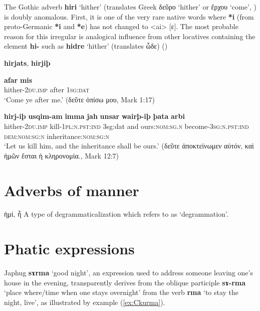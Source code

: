 \documentclass[11pt]{article}
\newcommand{\ipa}[1]{{\phon\textbf{#1}}}
\newcommand{\ipap}[1]{{\phon#1}}
\newcommand{\refb}[1]{(\ref{#1})}
\newcommand{\grec}[1]{{\mleccha #1}}
\begin{document}
The Gothic adverb \ipa{hiri} `hither' (translates Greek \grec{δεῦρο} `hither' or \grec{ἔρχου} `come', \citealt[185; H67]{lehmann86gothic}) is doubly anomalous. First, it is one of the very rare native words where \ipa{*i} (from proto-Germanic \ipa{*i} and \ipa{*e}) has not changed to <ai> [\ipap{ɛ}]. The most probable reason for this irregular is analogical influence from other locatives containing the element \ipa{hi-} such as \ipa{hidre} `hither' (translates \grec{ὧδε}) (\citealt{cercignani84hiri})

 \ipa{hirjats}, \ipa{hirjiþ}
 \citet[104]{braune53gotische}

\begin{exe}
\ex 
\gll \ipa{hirj-ats} \ipa{afar} \ipa{mis} \\
hither-\textsc{2du.imp} after \textsc{1sg:dat} \\
\glt `Come ye after me.' (\grec{δεῦτε ὀπίσω μου}, Mark 1:17)
\end{exe}

\begin{exe}
\ex 
\gll
\ipa{hirj-iþ} \ipa{usqim-am} \ipa{imma} \ipa{jah} \ipa{unsar} \ipa{wairþ-iþ} \ipa{þata} \ipa{arbi} \\
hither-\textsc{2du.imp} kill-\textsc{1pl:n.pst:ind} 3sg:dat and  ours:\textsc{nom:sg.n} become-\textsc{3sg:n.pst:ind} \textsc{dem:nom:sg:n} inheritance:\textsc{nom:sg:n} \\
\glt `Let us kill him, and the inheritance shall be ours.' (\grec{δεῦτε ἀποκτείνωμεν αὐτόν, καὶ ἡμῶν ἔσται ἡ κληρονομία.}, Mark 12:7)
\end{exe}

\citet[415]{osthoff1881morphologische}

\section{Adverbs of manner}

\grec{ἠμί}, \grec{ἦ}
A type of degrammaticalization which \citet[135]{norde09degrammaticalization} refers to as `degrammation'.

\section{Phatic expressions}
Japhug \ipa{sɤrma} `good night', an expression used to address someone leaving one's house in the evening, transparently derives from the oblique participle \ipa{sɤ-rma} `place where/time when one stays overnight' from the verb \ipa{rma} `to stay the night, live', as illustrated by example \refb{ex:Ckurma}.
\end{document}
